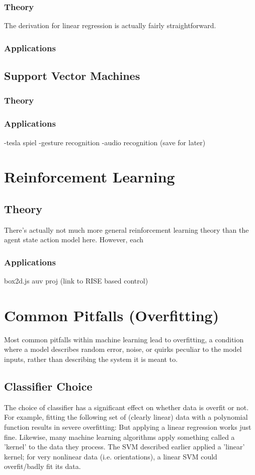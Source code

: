 \documentclass[11pt]{article}
\begin{document}
\subsubsection{Theory}
The derivation for linear regression is actually fairly straightforward.
\subsubsection{Applications}

\subsection{Support Vector Machines}
\subsubsection{Theory}
\subsubsection{Applications}
-tesla spiel
-gesture recognition
-audio recognition (save for later)

\section{Reinforcement Learning}
\subsection{Theory}
There's actually not much more general reinforcement learning theory than the agent state action model here. However, each 
\subsubsection{Applications}
box2d.js
auv proj (link to RISE based control)

\section{Common Pitfalls (Overfitting)}
Most common pitfalls within machine learning lead to overfitting, a condition where a model describes random error, noise, or quirks peculiar to the model inputs, rather than describing the system it is meant to.
\subsection{Classifier Choice}
The choice of classifier has a significant effect on whether data is overfit or not. For example, fitting the following set of (clearly linear) data with a polynomial function results in severe overfitting: 
But applying a linear regression works just fine. Likewise, many machine learning algorithms apply something called a 'kernel' to the data they process. The SVM described earlier applied a 'linear' kernel; for very nonlinear data (i.e. orientations), a linear SVM could overfit/badly fit its data.
\end{document}
